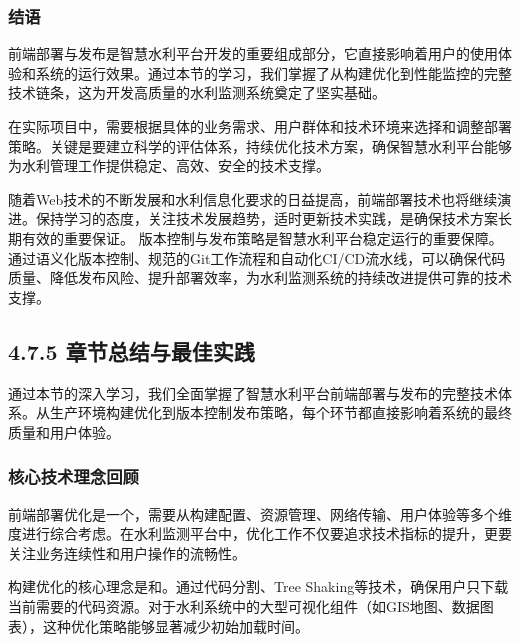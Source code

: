 \hypertarget{ux7ed3ux8bed}{%
\subsubsection{结语}\label{ux7ed3ux8bed}}

前端部署与发布是智慧水利平台开发的重要组成部分，它直接影响着用户的使用体验和系统的运行效果。通过本节的学习，我们掌握了从构建优化到性能监控的完整技术链条，这为开发高质量的水利监测系统奠定了坚实基础。

在实际项目中，需要根据具体的业务需求、用户群体和技术环境来选择和调整部署策略。关键是要建立科学的评估体系，持续优化技术方案，确保智慧水利平台能够为水利管理工作提供稳定、高效、安全的技术支撑。

随着Web技术的不断发展和水利信息化要求的日益提高，前端部署技术也将继续演进。保持学习的态度，关注技术发展趋势，适时更新技术实践，是确保技术方案长期有效的重要保证。  版本控制与发布策略是智慧水利平台稳定运行的重要保障。通过语义化版本控制、规范的Git工作流程和自动化CI/CD流水线，可以确保代码质量、降低发布风险、提升部署效率，为水利监测系统的持续改进提供可靠的技术支撑。

\hypertarget{ux7ae0ux8282ux603bux7ed3ux4e0eux6700ux4f73ux5b9eux8df5-1}{%
\subsection{4.7.5 章节总结与最佳实践}\label{ux7ae0ux8282ux603bux7ed3ux4e0eux6700ux4f73ux5b9eux8df5-1}}

通过本节的深入学习，我们全面掌握了智慧水利平台前端部署与发布的完整技术体系。从生产环境构建优化到版本控制发布策略，每个环节都直接影响着系统的最终质量和用户体验。

\hypertarget{ux6838ux5fc3ux6280ux672fux7406ux5ff5ux56deux987e}{%
\subsubsection{核心技术理念回顾}\label{ux6838ux5fc3ux6280ux672fux7406ux5ff5ux56deux987e}}


前端部署优化是一个，需要从构建配置、资源管理、网络传输、用户体验等多个维度进行综合考虑。在水利监测平台中，优化工作不仅要追求技术指标的提升，更要关注业务连续性和用户操作的流畅性。

构建优化的核心理念是和。通过代码分割、Tree Shaking等技术，确保用户只下载当前需要的代码资源。对于水利系统中的大型可视化组件（如GIS地图、数据图表），这种优化策略能够显著减少初始加载时间。

